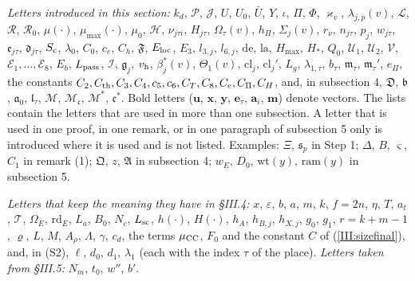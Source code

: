 \documentclass[11pt,letterpaper]{article}
\begin{document}
\emph{Letters introduced in this section:} $k_d$, $\mathcal P$, $\mathcal J$, $U$, $U_0$, $\bar U$, $Y$,
$\iota$, $\Pi$, $\Phi$, $\varkappa_v$, $\lambda_{j,p}(v)$, $\mathcal L$, $\mathcal R$, $\mathcal R_0$,
$\mu(\cdot)$, $\mu_{\max}(\cdot)$, $\mu_0$, $\mathcal H$, $\nu_{j\tau i}$, $H_{j\tau}$, $\Omega_\tau(v)$, $h_\Pi$, $\Sigma_j(v)$, $r_\nu$, $n_{j\tau}$, $p_j$, $w_{j\tau}$,
$\mathfrak e_{j\tau}$, $\mathfrak d_{j\tau}$, $S_{\rm c}$, $\lambda_0$, $C_0$, $c_e$, $C_h$,
$\mathfrak F$, $E_{\rm loc}$, $E_3$, $l_{3,j}$, $l_{6,j}$, $\mathrm{de}$, $\mathrm{la}$, $H_{\max}$, $H_*$,
$Q_0$, $\mathcal U_1$, $\mathcal U_2$, $\mathcal V$, $\mathcal E_1,\dots,\mathcal E_8$, $E_b$,
$L_{\rm pass}$, $\mathcal I$, $\mathfrak g_j$, $v_{\rm h}$, $\beta^{*}_j(v)$, $\Theta_1(v)$,
$\mathrm{cl}_j$, $\mathrm{cl}_j'$, $L_g$, $\lambda_{1,\tau}$, $b_\tau$, $\mathfrak m_\tau$,
$\mathfrak m_\tau'$, $e_\Pi$, the constants $C_2,C_{\rm th},C_3,C_4,c_5,c_6,C_T,C_8,C_e,C_\Pi,C_H$, and,
in subsection 4, $\mathfrak D$, $\mathfrak b$, $\mathfrak a_0$, $\mathfrak l_\tau$, $\mathcal M$,
$\mathcal M_{\mathfrak c}$, $\mathcal M^{*}$, $\mathfrak c^{*}$. Bold letters
($\mathbf u$, $\mathbf x$, $\mathbf y$, $\mathbf e_\tau$, $\mathbf a_i$, $\mathbf m$) denote vectors.
The lists contain the letters that are used in more than one subsection. A letter that is used in one
proof, in one remark, or in one paragraph of subsection 5 only is introduced where it is used and is not
listed. Examples: $\Xi$, $\mathfrak s_p$ in Step 1; $\Delta$, $B$, $\varsigma$, $C_1$ in remark (1);
$\mathfrak Q$, $z$, $\mathfrak A$ in subsection 4; $w_E$, $D_0$, $\mathrm{wt}(y)$, $\mathrm{ram}(y)$ in
subsection 5.

\emph{Letters that keep the meaning they have in \S III.4:} $x$, $\varepsilon$, $b$, $a$, $m$, $k$,
$f=2n$, $\eta$, $T$, $a_t$, $\mathcal T$, $\Omega_E$, $\mathrm{rd}_E$, $L_a$, $B_0$, $N_c$, $L_{\rm sc}$,
$h(\cdot)$, $H(\cdot)$, $h_A$, $h_{B,j}$, $h_{X,j}$, $g_0$, $g_1$, $r=k+m-1$, $\varrho$, $L$, $M$,
$A_\rho$, $\Lambda$, $\gamma$, $c_d$, the terms $\mu_{\rm CC}$, $F_0$ and the constant $C$ of
(\ref{III:sizefinal}), and, in (S2), $\ell$, $d_0$, $d_1$, $\lambda_1$ (each with the
index $\tau$ of the place). \emph{Letters taken from \S III.5:} $N_m$, $t_0$, $w''$, $b'$.
\end{document}
